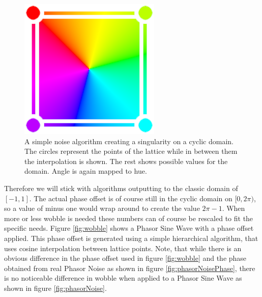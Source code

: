 \documentclass{utue} %
\begin{document}
\begin{figure}[h]
  \centering
  \includegraphics[width=0.45\linewidth]{images/simpleAlgo}
  \caption{A simple noise algorithm creating a singularity on a cyclic domain. The circles represent the points of the lattice while in between them the interpolation is shown. The rest shows possible values for the domain. Angle is again mapped to hue.}\label{fig:simpleAlgirithmSingularity}
\end{figure}
Therefore we will stick with algorithms outputting to the classic domain of $[-1,1]$. The actual phase offset is of course still in the cyclic domain on $[0,2\pi)$, so a value of minus one would wrap around to create the value $2\pi - 1$. When more or less wobble is needed these numbers can of course be rescaled to fit the specific needs. Figure \ref{fig:wobble} shows a Phasor Sine Wave with a phase offset applied. This phase offset is generated using a simple hierarchical algorithm, that uses cosine interpolation between lattice points. Note, that while there is an obvious difference in the phase offset used in figure \ref{fig:wobble} and the phase obtained from real Phasor Noise as shown in figure \ref{fig:phasorNoisePhase}, there is no noticeable difference in wobble when applied to a Phasor Sine Wave as shown in figure \ref{fig:phasorNoise}.
\end{document}
